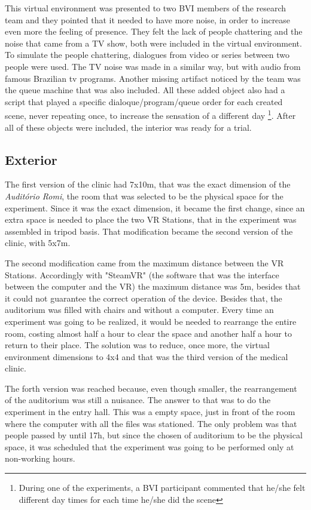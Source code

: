         This virtual environment was presented to two BVI members of the research team and they pointed that it needed to have more noise, in order to increase even more the feeling of presence. They felt the lack of people chattering and the noise that came from a TV show, both were included in the virtual environment. To simulate the people chattering, dialogues from video or series between two people were used. The TV noise was made in a similar way, but with audio from famous Brazilian tv programs. Another missing artifact noticed by the team was the queue machine that was also included. All these added object also had a script that played a specific dialoque/program/queue order for each created scene, never repeating once, to increase the sensation of a different day \footnote{During one of the experiments, a BVI participant commented that he/she felt different day times for each time he/she did the scene}. After all of these objects were included, the interior was ready for a trial.
        
    \subsection{Exterior}
    \label{subsec:exterior}
        
        The first version of the clinic had 7x10m, that was the exact dimension of the \textit{Auditório Romi}, the room that was selected to be the physical space for the experiment. Since it was the exact dimension, it became the first change, since an extra space is needed to place the two VR Stations, that in the experiment was assembled in tripod basis. That modification became the second version of the clinic, with 5x7m.
        
        The second modification came from the maximum distance between the VR Stations. Accordingly with "SteamVR" (the software that was the interface between the computer and the VR) the maximum distance was 5m, besides that it could not guarantee the correct operation of the device. Besides that, the auditorium was filled with chairs and without a computer. Every time an experiment was going to be realized, it would be needed to rearrange the entire room, costing almost half a hour to clear the space and another half a hour to return to their place. The solution was to reduce, once more, the virtual environment dimensions to 4x4 and that was the third version of the medical clinic.
        
        The forth version was reached because, even though smaller, the rearrangement of the auditorium was still a nuisance. The answer to that was to do the experiment in the entry hall. This was a empty space, just in front of the room where the computer with all the files was stationed. The only problem was that people passed by until 17h, but since the chosen of auditorium to be the physical space, it was scheduled that the experiment was going to be performed only at non-working hours.
        
